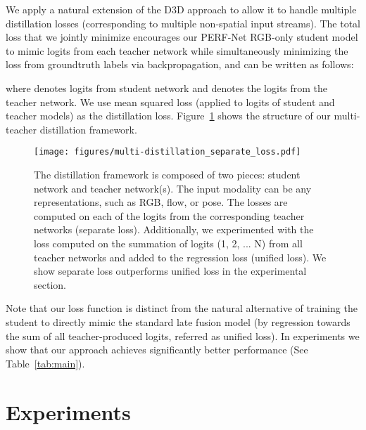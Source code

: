 \documentclass[10pt,twocolumn,letterpaper]{article}
\begin{document}
We apply a natural extension of the D3D approach to allow it to handle multiple distillation
losses (corresponding to multiple non-spatial input streams). The total loss that we jointly minimize encourages our  PERF-Net RGB-only student model to
 mimic  logits from each teacher network while simultaneously 
 minimizing the loss from groundtruth labels via backpropagation, 
 and can be written as follows:
 


\vspace{-0.2cm}
{\footnotesize

}

\noindent where  denotes logits from student network and  denotes the logits from the  teacher network.  We use mean squared loss (applied to logits of student and teacher models) as the distillation loss. Figure~\ref{fig:distillation} shows the structure of our multi-teacher distillation framework. 

\begin{figure}[t!]
    \centering
    \texttt{[image: figures/multi-distillation\_separate\_loss.pdf]}
    \caption{ The distillation framework is composed of two pieces: student network and teacher network(s). The input modality can be any representations, such as RGB, flow, or pose. The losses are computed on each of the logits from the corresponding teacher networks (separate loss). Additionally, we experimented with the loss computed on the summation of logits (1, 2, ... N) from all teacher networks and added to the regression loss (unified loss). We show separate loss outperforms unified loss in the experimental section.}
    \label{fig:distillation}
\end{figure}

Note that our loss function is distinct from the natural alternative of training the student to directly mimic the standard late fusion model (by regression towards the sum of all teacher-produced logits, referred as unified loss).  In experiments we show that our approach achieves significantly better performance (See Table~\ref{tab:main}).



















\section{Experiments}
\label{sec:experiments}
\end{document}
